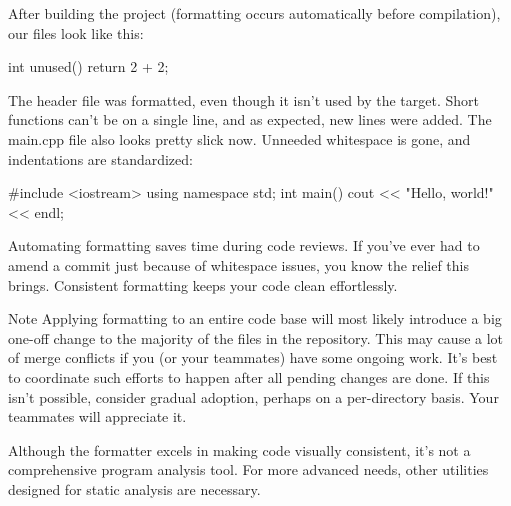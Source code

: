 After building the project (formatting occurs automatically before compilation), our files look like this:


\begin{cpp}
int unused() {
    return 2 + 2;
}
\end{cpp}

The header file was formatted, even though it isn’t used by the target. Short functions can’t be on a single line, and as expected, new lines were added. The main.cpp file also looks pretty slick now. Unneeded whitespace is gone, and indentations are standardized:


\begin{cpp}
#include <iostream>
using namespace std;
int main() {
    cout << "Hello, world!" << endl;
}
\end{cpp}

Automating formatting saves time during code reviews. If you’ve ever had to amend a commit just because of whitespace issues, you know the relief this brings. Consistent formatting keeps your code clean effortlessly.

\begin{myNotic}{Note}
Applying formatting to an entire code base will most likely introduce a big one-off change to the majority of the files in the repository. This may cause a lot of merge conflicts if you (or your teammates) have some ongoing work. It’s best to coordinate such efforts to happen after all pending changes are done. If this isn’t possible, consider gradual adoption, perhaps on a per-directory basis. Your teammates will appreciate it.
\end{myNotic}

Although the formatter excels in making code visually consistent, it’s not a comprehensive program analysis tool. For more advanced needs, other utilities designed for static analysis are necessary.










